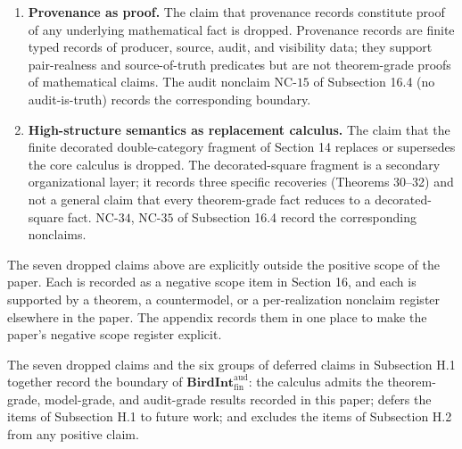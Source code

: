 \documentclass[11pt]{article}
\theoremstyle{definition}
\begin{document}
\begin{enumerate}
\item
  \textbf{Provenance as proof.} The claim that provenance records constitute proof of any underlying mathematical fact is dropped. Provenance records are finite typed records of producer, source, audit, and visibility data; they support pair-realness and source-of-truth predicates but are not theorem-grade proofs of mathematical claims. The audit nonclaim \(\mathrm{NC}\text{-}15\) of Subsection 16.4 (no audit-is-truth) records the corresponding boundary.
\item
  \textbf{High-structure semantics as replacement calculus.} The claim that the finite decorated double-category fragment of Section 14 replaces or supersedes the core calculus is dropped. The decorated-square fragment is a secondary organizational layer; it records three specific recoveries (Theorems 30--32) and not a general claim that every theorem-grade fact reduces to a decorated-square fact. \(\mathrm{NC}\text{-}34\), \(\mathrm{NC}\text{-}35\) of Subsection 16.4 record the corresponding nonclaims.
\end{enumerate}

The seven dropped claims above are explicitly outside the positive scope of the paper. Each is recorded as a negative scope item in Section 16, and each is supported by a theorem, a countermodel, or a per-realization nonclaim register elsewhere in the paper. The appendix records them in one place to make the paper's negative scope register explicit.

The seven dropped claims and the six groups of deferred claims in Subsection H.1 together record the boundary of \(\mathbf{BirdInt}^{\mathrm{aud}}_{\mathrm{fin}}\): the calculus admits the theorem-grade, model-grade, and audit-grade results recorded in this paper; defers the items of Subsection H.1 to future work; and excludes the items of Subsection H.2 from any positive claim.
 
\clearpage
\nocite{*}


\end{document}
